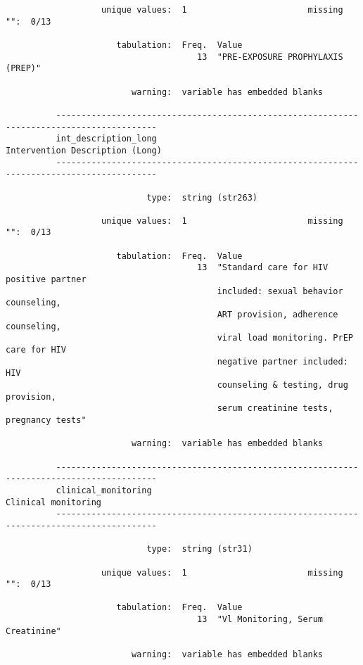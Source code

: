 \documentclass{article}
\begin{document}
\begin{verbatim}
                   unique values:  1                        missing "":  0/13
          
                      tabulation:  Freq.  Value
                                      13  "PRE-EXPOSURE PROPHYLAXIS (PREP)"
          
                         warning:  variable has embedded blanks
          
          ------------------------------------------------------------------------------------------
          int_description_long                                       Intervention Description (Long)
          ------------------------------------------------------------------------------------------
          
                            type:  string (str263)
          
                   unique values:  1                        missing "":  0/13
          
                      tabulation:  Freq.  Value
                                      13  "Standard care for HIV positive partner
                                          included: sexual behavior counseling,
                                          ART provision, adherence counseling,
                                          viral load monitoring. PrEP care for HIV
                                          negative partner included: HIV
                                          counseling & testing, drug provision,
                                          serum creatinine tests, pregnancy tests"
          
                         warning:  variable has embedded blanks
          
          ------------------------------------------------------------------------------------------
          clinical_monitoring                                                    Clinical monitoring
          ------------------------------------------------------------------------------------------
          
                            type:  string (str31)
          
                   unique values:  1                        missing "":  0/13
          
                      tabulation:  Freq.  Value
                                      13  "Vl Monitoring, Serum Creatinine"
          
                         warning:  variable has embedded blanks
          

\end{verbatim}
\end{document}
